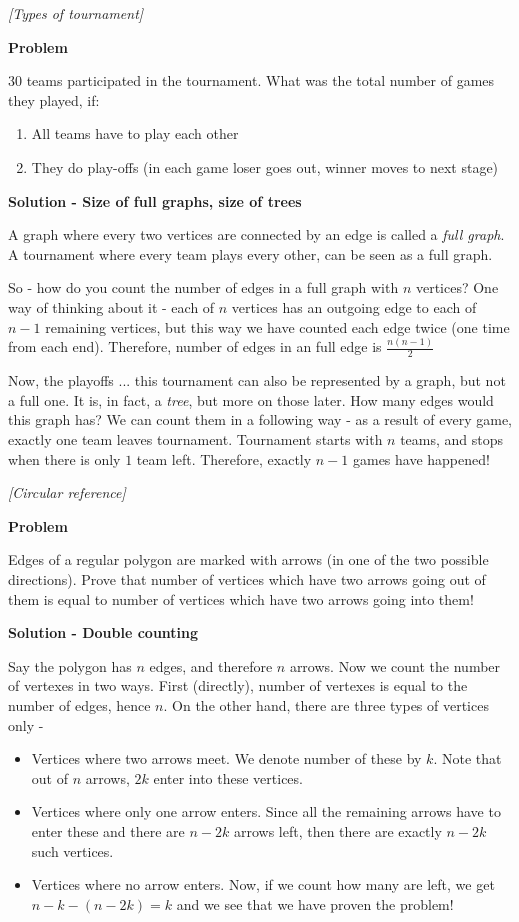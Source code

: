 %
\filbreak
\begin{problem}
\textit{[Types of tournament]}

\textbf{Problem}

30 teams participated in the tournament. What was the total number of games they played, if:
\begin{enumerate}
\item All teams have to play each other
\item They do play-offs (in each game loser goes out, winner moves to next stage)
\end{enumerate}

\textbf{Solution - Size of full graphs, size of trees}

A graph where every two vertices are connected by an edge is called a \textit{full graph}. A tournament where  every team plays every other, can be seen as a full graph. 

So - how do you count the number of edges in a full graph with $n$ vertices? One way of thinking about it - each of $n$ vertices has an outgoing edge to each of $n-1$ remaining vertices, but this way we have counted each edge twice (one time from each end). Therefore, number of edges in an full edge is $\frac{n(n-1)}{2}$ 

Now, the playoffs ... this tournament can also be represented by a graph, but not a full one. It is, in fact, a \textit{tree}, but more on those later. How many edges would this graph has? We can count them in a following way - as a result of every game, exactly one team leaves tournament. Tournament starts with $n$ teams, and stops when there is only $1$ team left. Therefore, exactly $n-1$ games have happened!
\end{problem}
%
\filbreak
\begin{problem}
\textit{[Circular reference]}

\textbf{Problem}

Edges of a regular polygon are marked with arrows (in one of the two possible directions). Prove that number of vertices which have two arrows going out of them is equal to number of vertices which have two arrows going into them!

\textbf{Solution - Double counting}

Say the polygon has $n$ edges, and therefore $n$ arrows.
Now we count the number of vertexes in two ways. 
First (directly), number of vertexes is equal to the number of edges, hence $n$.
On the other hand, there are three types of vertices only - 
\begin{itemize}
\item Vertices where two arrows meet. We denote number of these by $k$.  Note that out of $n$ arrows, $2k$ enter into these vertices.
\item Vertices where only one arrow enters. Since all the remaining arrows have to enter these and there are $n - 2k$ arrows left, then there are exactly $n - 2k$ such vertices.  
\item Vertices where no arrow enters. Now, if we count how many are left, we get $n - k - (n -2k) = k$ and we see that we have proven the problem! 
\end{itemize}


\end{problem}
